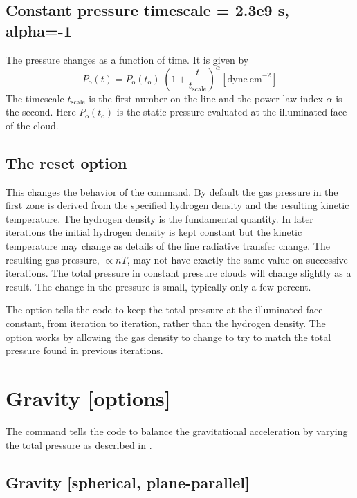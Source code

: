 \subsection{Constant pressure timescale = 2.3e9 s, alpha=-1}
\label{sec:ConstantPressureTimescale}

The pressure changes as a function of time.
It is given by
\begin{equation}
P_{\mathrm{o}}(t)=P_{\mathrm{o}}(t_{\mathrm{o}})\;\left(1+\frac{t}{t_{\mathrm{scale}}}\right)^{\alpha}
[\mathrm{dyne\ cm}^{-2}]
\end{equation}
The timescale $t_{\mathrm{scale}}$ is the first number on the line
and the power-law index $\alpha$ is the second.
Here $P_{\mathrm{o}}(t_{\mathrm{o}})$ is the static pressure evaluated at 
the illuminated face of the cloud.

\subsection{The reset option}

This changes the behavior of the  command.
By default the gas pressure in the first zone is derived from
the specified hydrogen density and the resulting kinetic temperature.
The hydrogen density is the fundamental quantity.
In later iterations the initial hydrogen density 
is kept constant but the kinetic temperature may change
as details of the line radiative transfer change. 
The resulting gas pressure, $\propto nT$,
may not have exactly the same value on successive iterations.
The total pressure in constant pressure clouds will change 
slightly as a result.
The change in the pressure is small, typically only
a few percent. 

The  option tells the code to keep the total pressure
at the illuminated face constant, from iteration to iteration,
rather than the hydrogen density.
The  option works by allowing the gas density
to change to try to match the total pressure 
found in previous iterations.

\section{Gravity [options] }

The  command tells the code to balance the gravitational 
acceleration by varying the total pressure as described in 
\citealp{AscasibarDiaz2009}.

\subsection{Gravity [spherical, plane-parallel] }

